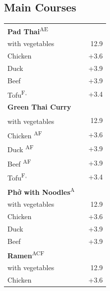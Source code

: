 \documentclass[a4paper,12pt]{article}
\newcommand{\vegan}{\textbf{\scriptsize \color{vegan}{Vegan}}}
\begin{document}
\begin{multicols}{2}
\section*{Main Courses}
\begin{tabular}{Lrr}
\textbf{Pad Thai}\textsuperscript{{\scriptsize AE}}\\
\hspace{0.4cm}with vegetables & & 12.9\\
\hspace{0.4cm}Chicken & & +3.6\\
\hspace{0.4cm}Duck & & +3.9\\
\hspace{0.4cm}Beef & & +3.9\\
\hspace{0.4cm}Tofu\textsuperscript{{\scriptsize F, \vegan}} & & +3.4\\
\textbf{Green Thai Curry}\\
\hspace{0.4cm}with vegetables\textsuperscript{\vegan} & & 12.9\\
\hspace{0.4cm}Chicken \textsuperscript{{\scriptsize AF}} & & +3.6\\
\hspace{0.4cm}Duck \textsuperscript{{\scriptsize AF}} & & +3.9\\
\hspace{0.4cm}Beef \textsuperscript{{\scriptsize AF}} & & +3.9\\
\hspace{0.4cm}Tofu\textsuperscript{{\scriptsize F, \vegan}} & & +3.4\\
\textbf{Phở with Noodles}\textsuperscript{{\scriptsize A}}\\
\hspace{0.4cm}with vegetables & & 12.9\\
\hspace{0.4cm}Chicken & & +3.6\\
\hspace{0.4cm}Duck & & +3.9\\
\hspace{0.4cm}Beef & & +3.9\\
\textbf{Ramen}\textsuperscript{{\scriptsize ACF}}\\
\hspace{0.4cm}with vegetables & & 12.9\\
\hspace{0.4cm}Chicken & & +3.6\\

\end{tabular}
\end{multicols}
\end{document}
